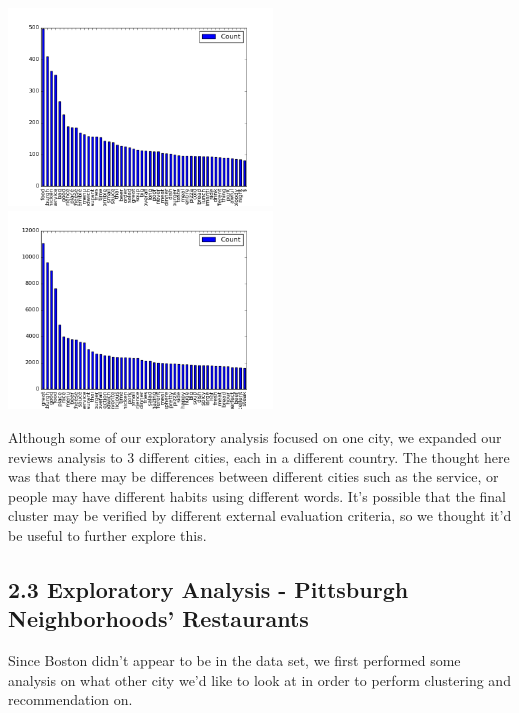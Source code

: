 \documentclass{neu_handout}
\begin{document}
\begin{center}
\includegraphics[width=70mm,scale=0.5]{top50_negativereviews}
\includegraphics[width=70mm,scale=0.5]{top50_positivereviews}
\end{center}

Although some of our exploratory analysis focused on one city, we expanded our reviews analysis to 3 different cities, each in a different country. The thought here was that there may be differences between different cities such as the service, or people may have different habits using different words. It's possible that the final cluster may be verified by different external evaluation criteria, so we thought it'd be useful to further explore this. \\

\subsection*{2.3 Exploratory Analysis - Pittsburgh Neighborhoods' Restaurants}

   Since Boston didn't appear to be in the data set, we first performed some analysis on what other city we'd like to look at in order to perform clustering and recommendation on.
   
\end{document}
